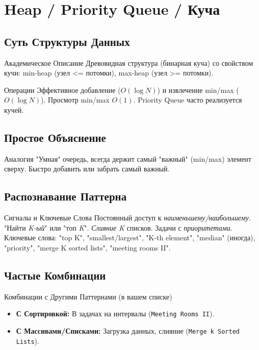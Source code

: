 \section{Heap / Priority Queue / Куча}

\subsection{Суть Структуры Данных}
\begin{myblock}{Академическое Описание}
    Древовидная структура (бинарная куча) со свойством кучи: min-heap (узел <= потомки), max-heap (узел >= потомки).
\end{myblock}
\begin{myblock}{Операции}
    Эффективное добавление ($O(\log N)$) и извлечение min/max ($O(\log N)$). Просмотр min/max $O(1)$. Priority Queue часто реализуется кучей.
\end{myblock}

\subsection{Простое Объяснение}
\begin{myblock}{Аналогия}
    "Умная" очередь, всегда держит самый "важный" (min/max) элемент сверху. Быстро добавить или забрать самый важный.
\end{myblock}

\subsection{Распознавание Паттерна}
\begin{myblock}{Сигналы и Ключевые Слова}
    Постоянный доступ к \emph{наименьшему/наибольшему}. "Найти \emph{K-ый}" или "топ \emph{K}". \emph{Слияние K} списков. Задачи с \emph{приоритетами}. \newline
    Ключевые слова: "top K", "smallest/largest", "K-th element", "median" (иногда), "priority", "merge K sorted lists", "meeting rooms II".
\end{myblock}

\subsection{Частые Комбинации}
\begin{myblock}{Комбинации с Другими Паттернами (в вашем списке)}
    \begin{itemize}[nosep, leftmargin=*]
        \item \textbf{С Сортировкой:} В задачах на интервалы (\texttt{Meeting Rooms II}).
        \item \textbf{С Массивами/Списками:} Загрузка данных, слияние (\texttt{Merge k Sorted Lists}).
    \end{itemize}
\end{myblock}

